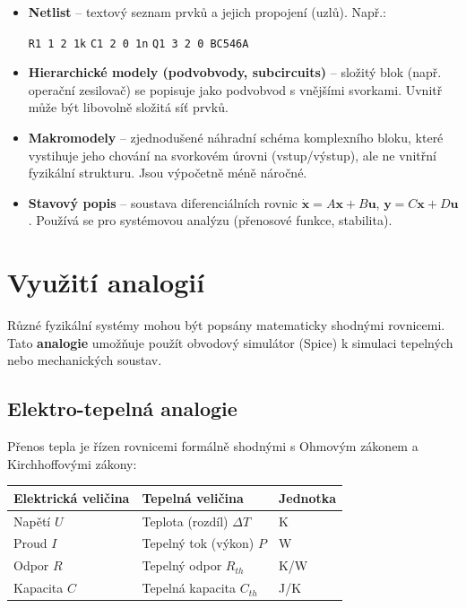 \begin{itemize}
    \item \textbf{Netlist} -- textový seznam prvků a jejich propojení (uzlů). Např.:
    \begin{center}
    \texttt{R1 1 2 1k} \quad \texttt{C1 2 0 1n} \quad \texttt{Q1 3 2 0 BC546A}
    \end{center}
    \item \textbf{Hierarchické modely (podvobvody, subcircuits)} -- složitý blok (např. operační zesilovač) se popisuje jako podvobvod s vnějšími svorkami. Uvnitř může být libovolně složitá síť prvků.
    \item \textbf{Makromodely} -- zjednodušené náhradní schéma komplexního bloku, které vystihuje jeho chování na svorkovém úrovni (vstup/výstup), ale ne vnitřní fyzikální strukturu. Jsou výpočetně méně náročné.
    \item \textbf{Stavový popis} -- soustava diferenciálních rovnic $\dot{\mathbf{x}} = A\mathbf{x} + B\mathbf{u}$, $\mathbf{y} = C\mathbf{x} + D\mathbf{u}$. Používá se pro systémovou analýzu (přenosové funkce, stabilita).
\end{itemize}

\section{Využití analogií}
Různé fyzikální systémy mohou být popsány matematicky shodnými rovnicemi. Tato \textbf{analogie} umožňuje použít obvodový simulátor (Spice) k simulaci tepelných nebo mechanických soustav.

\subsection{Elektro-tepelná analogie}
Přenos tepla je řízen rovnicemi formálně shodnými s Ohmovým zákonem a Kirchhoffovými zákony:

\begin{center}
\begin{tabular}{lll}
\toprule
\textbf{Elektrická veličina} & \textbf{Tepelná veličina} & \textbf{Jednotka} \\
\midrule
Napětí $U$ & Teplota (rozdíl) $\Delta T$ & K \\
Proud $I$ & Tepelný tok (výkon) $P$ & W \\
Odpor $R$ & Tepelný odpor $R_{th}$ & K/W \\
Kapacita $C$ & Tepelná kapacita $C_{th}$ & J/K \\
\bottomrule
\end{tabular}
\end{center}

